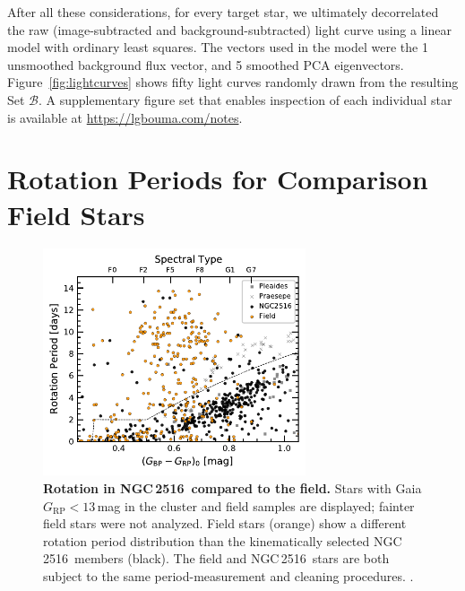 \documentclass[12pt,twocolumn,tighten]{aastex63}
\newcommand{\cn}{NGC\,2516} %
\begin{document}
After all these considerations, for every target star, we ultimately
decorrelated the raw (image-subtracted and background-subtracted)
light curve using a linear model with ordinary least squares.  The
vectors used in the model were the 1 unsmoothed background flux
vector, and 5 smoothed PCA eigenvectors.  Figure~\ref{fig:lightcurves}
shows fifty light curves randomly drawn from the resulting Set
$\mathcal{B}$.  A supplementary figure set that enables inspection of
each individual star is available at \url{https://lgbouma.com/notes}.





\section{Rotation Periods for Comparison Field Stars}
\label{app:compstar}

\begin{figure}[t]
	\begin{center}
		\leavevmode
    \includegraphics[width=0.69\textwidth]{f13.pdf}
	\end{center}
	\vspace{-0.7cm}
	\caption{ {\bf Rotation in \cn\ compared to the field.}
  Stars with Gaia $G_\mathrm{RP}<13$\,mag in the cluster and field samples are
  displayed; fainter field stars were not analyzed.  Field
  stars (orange) show a different rotation period distribution than
  the kinematically selected \cn\ members (black).  The field and \cn\
  stars are both subject to the same 
  period-measurement and cleaning procedures.
  .
  \label{fig:compstar}
	}
\end{figure}
\end{document}
